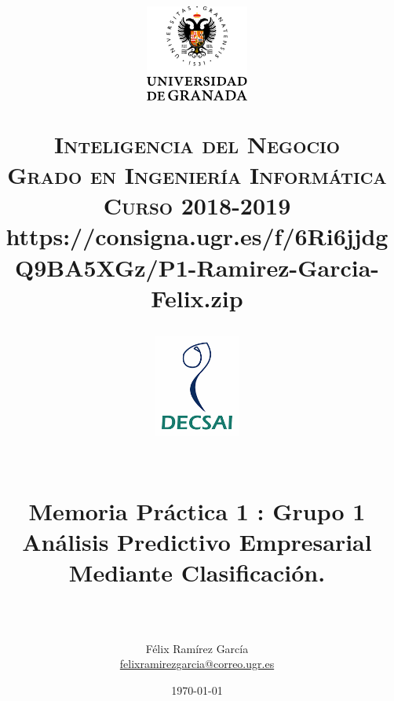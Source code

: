 
\usepackage{url}

\title{	
	\normalfont \normalsize
	\begin{figure}[htb]
		\centering
		\includegraphics[width=0.3\textwidth]{./imagenes/1}
	\end{figure}
	\textsc{\textbf{Inteligencia del Negocio} \\ Grado en Ingeniería Informática \\ 
	Curso 2018-2019} \\ https://consigna.ugr.es/f/6Ri6jjdgQ9BA5XGz/P1-Ramirez-Garcia-Felix.zip \\[10pt] %
	\begin{figure}[htb]
		\centering
		\includegraphics[width=0.25\textwidth]{./imagenes/2}
	\end{figure}
	\horrule{0.5pt} \\[0.4cm] %
	\huge Memoria Práctica 1 : Grupo 1  \\
	\huge Análisis Predictivo Empresarial Mediante Clasificación.
	\\ %
	\horrule{2pt} \\[0.5cm] %
}
\author{Félix Ramírez García  \\
\href{mailto:felixramirezgarcia@correo.ugr.es}{felixramirezgarcia@correo.ugr.es}} %
\date{\normalsize\today} %



